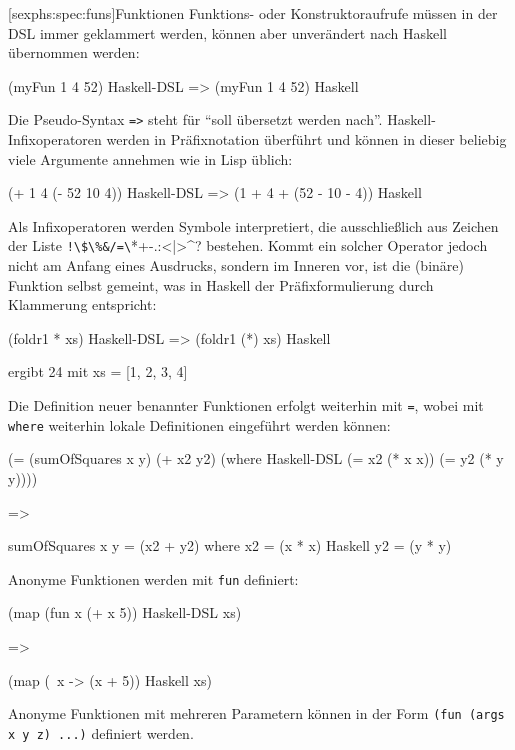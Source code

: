 \documentclass[12pt, a4paper, bibgerm]{scrbook}
\newenvironment{DIFnomarkup}{}{}
\newcommand\icode[1]{\lstinline?#1?}
\newcommand\lsubsection{}
\begin{document}
\lsubsection[sexphs:spec:funs]{Funktionen}
Funktions- oder Konstruktoraufrufe müssen in der DSL immer
geklammert werden, können aber unverändert nach Haskell übernommen
werden:
\begin{DIFnomarkup}\begin{code}
(myFun 1 4 52)              Haskell-DSL
=>
(myFun 1 4 52)              Haskell
\end{code}\end{DIFnomarkup}
Die Pseudo-Syntax \icode{=>} steht für ``soll übersetzt werden
nach''. Haskell-Infixoperatoren werden in Präfixnotation überführt und
können in dieser beliebig viele Argumente annehmen wie in Lisp üblich:
\begin{DIFnomarkup}\begin{code}
(+ 1 4 (- 52 10 4))         Haskell-DSL
=>
(1 + 4 + (52 - 10 - 4))     Haskell
\end{code}\end{DIFnomarkup}
Als Infixoperatoren werden Symbole interpretiert, die ausschließlich
aus Zeichen der Liste \icode{!\$\%&/=\?*+-.:<|>^}
bestehen. Kommt ein solcher Operator jedoch nicht am Anfang eines
Ausdrucks, sondern im Inneren vor, ist die (binäre) Funktion selbst
gemeint, was in Haskell der Präfixformulierung durch Klammerung
entspricht:
\begin{DIFnomarkup}\begin{code}
(foldr1 * xs)               Haskell-DSL
=>
(foldr1 (*) xs)             Haskell

ergibt 24 mit xs = [1, 2, 3, 4]
\end{code}\end{DIFnomarkup}
Die Definition neuer benannter Funktionen erfolgt weiterhin mit
\icode{=}, wobei mit \icode{where} weiterhin lokale Definitionen
eingeführt werden können:
\begin{DIFnomarkup}\begin{code}
(= (sumOfSquares x y)
   (+ x2 y2)
 (where                     Haskell-DSL
  (= x2 (* x x))
  (= y2 (* y y))))

=>

sumOfSquares x y = (x2 + y2)
  where
    x2 = (x * x)            Haskell
    y2 = (y * y)
\end{code}\end{DIFnomarkup}
Anonyme Funktionen werden mit \icode{fun} definiert:
\begin{DIFnomarkup}\begin{code}
(map 
  (fun x (+ x 5))           Haskell-DSL
  xs)

=>

(map
  (\ x -> (x + 5))          Haskell
  xs)
\end{code}\end{DIFnomarkup}
Anonyme Funktionen mit mehreren Parametern können in der Form
\icode{(fun (args x y z) ...)} definiert werden.
\end{document}
